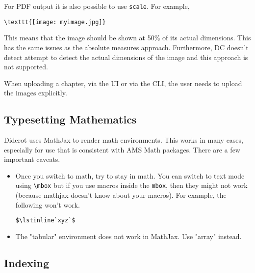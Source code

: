 \begin{important}
For PDF output it is also possible to use \lstinline`scale`.  For example,
\begin{lstlisting}
\texttt{[image: myimage.jpg]}
\end{lstlisting}

This means that the image should be shown at 50\% of its actual dimensions.  This has  the same issues as the absolute measures approach. Furthermore, DC doesn't detect attempt to detect the actual dimensions of the image and this approach is not supported.
\end{important}

\begin{gram}
When uploading a chapter, via the UI or via the CLI, the user needs to upload the images explicitly.   
\end{gram}

\subsection{Typesetting Mathematics}

Diderot uses MathJax to render math environments.  This works in many cases, especially for use that is consistent with AMS Math packages.  There are a few important caveats. 
%
\begin{itemize}
\item Once you switch to math, try to stay in math.  You can switch to text mode using \lstinline`\mbox` but if you use macros inside  the \lstinline`mbox`, then they might not work (because mathjax doesn't know about your macros).  For example, the following won't work. 
\begin{lstlisting}
$\lstinline`xyz`$
\end{lstlisting}

\item The "tabular" environment does not work in MathJax.  Use "array" instead.
\end{itemize}


\subsection{Indexing}

